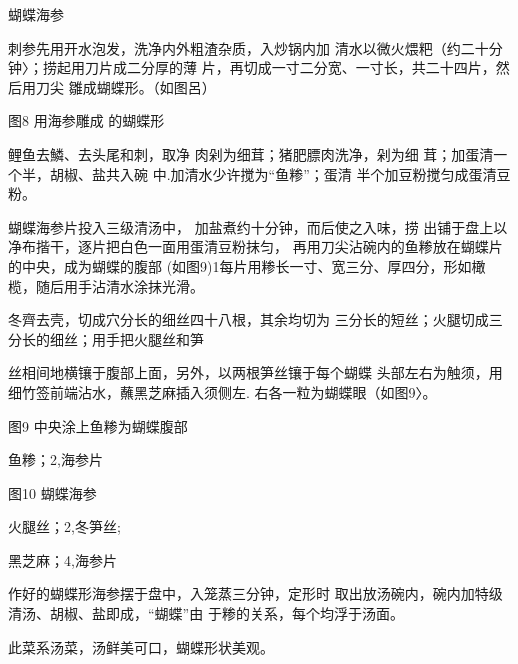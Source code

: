 \begin{recipe}{蝴蝶海参}

\ingredients



\cooking

\step 刺参先用开水泡发，洗净内外粗渣杂质，入炒锅内加 清水以微火煨粑（约二十分钟〉；捞起用刀片成二分厚的薄 片，再切成一寸二分宽、一寸长，共二十四片，然后用刀尖 雛成蝴蝶形。（如图呂）

图8 用海参雕成 的蝴蝶形

\step 鲤鱼去鱗、去头尾和刺，取净 肉剁为细茸；猪肥膘肉洗净，剁为细 茸；加蛋清一个半，胡椒、盐共入碗 中.加清水少许搅为“鱼糁”；蛋清 半个加豆粉搅匀成蛋清豆粉。

\step 蝴蝶海参片投入三级清汤中， 加盐煮约十分钟，而后使之入味，捞 出铺于盘上以净布揩干，逐片把白色一面用蛋清豆粉抹匀， 再用刀尖沾碗内的鱼糁放在蝴蝶片的中央，成为蝴蝶的腹部 (如图9)1每片用糁长一寸、宽三分、厚四分，形如橄 榄，随后用手沾清水涂抹光滑。

\step 冬齊去壳，切成穴分长的细丝四十八根，其余均切为 三分长的短丝；火腿切成三分长的细丝；用手把火腿丝和笋

丝相间地横镶于腹部上面，另外，以两根笋丝镶于每个蝴蝶 头部左右为触须，用细竹签前端沾水，蘸黑芝麻插入须侧左. 右各一粒为蝴蝶眼（如图9〉。

图9 中央涂上鱼糁为蝴蝶腹部

\step 鱼糁；2,海参片

图10 蝴蝶海参

\step 火腿丝；2,冬笋丝;

\step 黑芝麻；4,海参片

\step 作好的蝴蝶形海参摆于盘中，入笼蒸三分钟，定形时 取出放汤碗内，碗内加特级清汤、胡椒、盐即成，“蝴蝶”由 于糁的关系，每个均浮于汤面。

\notes

此菜系汤菜，汤鲜美可口，蝴蝶形状美观。

\end{recipe}

